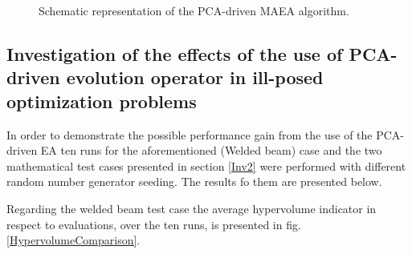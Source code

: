 \begin{figure}[h!]
\begin{minipage}[b]{1\linewidth}
 \centering
\end{minipage}
\caption{Schematic representation of the PCA-driven MAEA algorithm.} 
\label{MAEAPCA2}
\end{figure}



\subsection{Investigation of the effects of the use of PCA-driven evolution operator in ill-posed optimization problems}

In order to demonstrate the possible performance gain from the use of the PCA-driven EA ten runs for the aforementioned (Welded beam) case and the two mathematical test cases presented in section \ref{Inv2} were performed with different random number generator seeding. The results fo them are presented below. 

Regarding the welded beam test case the average hypervolume indicator in respect to evaluations, over the ten runs, is presented in fig. \ref{HypervolumeComparison}. 

